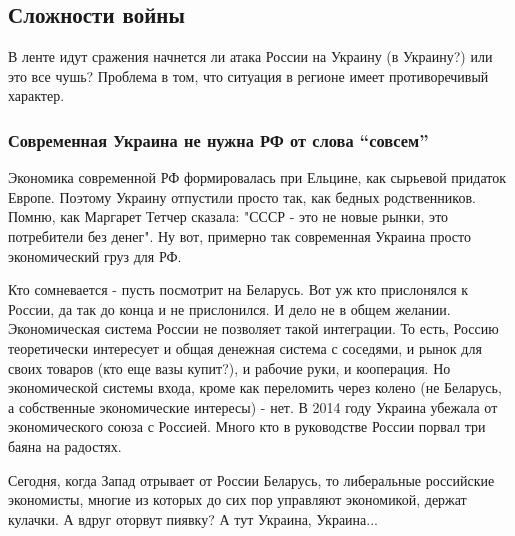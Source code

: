  
 
 
 
 

\subsection{Сложности войны}
\label{sec:18_04_2021.fb.zharkih_denis.1.ukraina_rossia_kapitalizm_bratstvo}

В ленте идут сражения начнется ли атака России на Украину (в Украину?) или это
все чушь? Проблема в том, что ситуация в регионе имеет противоречивый характер.

\subsubsection{Современная Украина не нужна РФ от слова \enquote{совсем}}

Экономика современной РФ формировалась при Ельцине, как сырьевой придаток
Европе. Поэтому Украину отпустили просто так, как бедных родственников. Помню,
как Маргарет Тетчер сказала: "СССР - это не новые рынки, это потребители без
денег". Ну вот, примерно так современная Украина просто экономический груз для
РФ. 

Кто сомневается - пусть посмотрит на Беларусь. Вот уж кто прислонялся к России,
да так до конца и не прислонился. И дело не в общем желании. Экономическая
система России не позволяет такой интеграции. То есть, Россию теоретически
интересует и общая денежная система с соседями, и рынок для своих товаров (кто
еще вазы купит?), и рабочие руки, и кооперация. Но экономической системы входа,
кроме как переломить через колено (не Беларусь, а собственные экономические
интересы) - нет. В 2014 году Украина убежала от экономического союза с Россией.
Много кто в руководстве России порвал три баяна на радостях. 

Сегодня, когда Запад отрывает от России Беларусь, то либеральные российские
экономисты, многие из которых до сих пор управляют экономикой, держат кулачки.
А вдруг оторвут пиявку? А тут Украина, Украина... 

